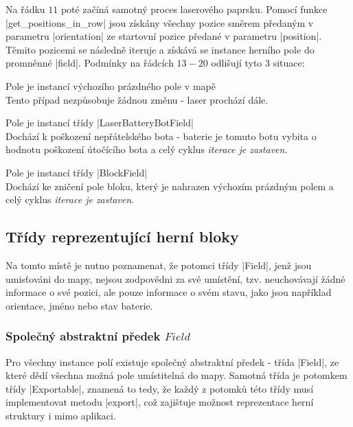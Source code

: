Na řádku $11$ poté začíná samotný proces laserového paprsku. Pomocí funkce \ic|get_positions_in_row| jsou získány všechny pozice směrem předaným v parametru \ic|orientation| ze startovní pozice předané v parametru \ic|position|. Těmito pozicemi se následně iteruje a získává se instance herního pole do promněnné \ic|field|. Podmínky na řádcích $13-20$ odlišují tyto 3 situace:
\begin{description}
    \item Pole je instancí výchozího prázdného pole v mapě \\
        Tento případ nezpůsobuje žádnou změnu - laser prochází dále.

    \item Pole je instancí třídy \ic|LaserBatteryBotField| \\
        Dochází k poškození nepřátelského bota - baterie je tomuto botu vybita o hodnotu poškození útočícího bota a celý cyklus \emph{iterace je zastaven}.

    \item Pole je instancí třídy \ic|BlockField| \\
        Dochází ke zničení pole bloku, který je nahrazen výchozím prázdným polem a celý cyklus \emph{iterace je zastaven}.
\end{description}

\subsection{Třídy reprezentující herní bloky}

Na tomto místě je nutno poznamenat, že potomci třídy \ic|Field|, jenž jsou umisťováni do mapy, nejsou zodpovědni za své umístění, tzv. neuchovávají žádné informace o své pozici, ale pouze informace o svém stavu, jako jsou například orientace, jméno nebo stav baterie. 

\subsubsection{Společný abstraktní předek $Field$}

\begin{sloppypar}
	Pro všechny instance polí existuje společný abstraktní předek - třída \ic|Field|, ze které dědí všechna možná pole umístitelná do mapy. Samotná třída je potomkem třídy \ic|Exportable|, znamená to tedy, že každý z potomků této třídy musí implementovat metodu \ic|export|, což zajištuje možnost reprezentace herní struktury i mimo aplikaci.
\end{sloppypar}

